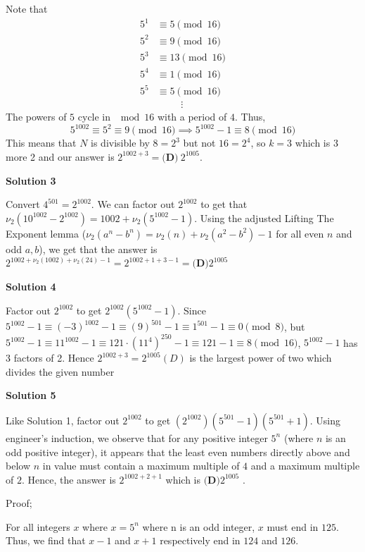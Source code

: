 \begin{enumerate}
 Note that
 \begin{align*} 5^1 &\equiv 5 \pmod{16} \\ 5^2 &\equiv 9 \pmod{16} \\ 5^3 &\equiv 13 \pmod{16} \\ 5^4 &\equiv 1 \pmod{16} \\ 5^5 &\equiv 5 \pmod{16} \\ &\: \: \qquad \vdots \end{align*}
The powers of $5$ cycle in $\mod{16}$ with a period of $4$. Thus, 
 \[5^{1002} \equiv 5^2 \equiv 9 \pmod{16} \implies 5^{1002} - 1 \equiv 8 \pmod{16}\]This means that $N$ is divisible by $8= 2^3$ but not $16 = 2^4$, so $k = 3$ which is 3 more 2 and our answer is $2^{1002 + 3} =\boxed{\textbf{(D)}\: 2^{1005}}$.

 



\textbf{Solution 3}

Convert $4^{501}=2^{1002}$. We can factor out $2^{1002}$ to get that $\nu_2(10^{1002}-2^{1002})=1002+\nu_2(5^{1002}-1)$. Using the adjusted Lifting The Exponent lemma ($\nu_2(a^n-b^n)=\nu_2(n)+\nu_2(a^2-b^2)-1$ for all even $n$ and odd $a,b$), we get that the answer is $2^{1002+\nu_2(1002)+\nu_2(24)-1}=2^{1002+1+3-1}=\boxed{\textbf{(D)}2^{1005}}$




\textbf{Solution 4}

Factor out $2^{1002}$ to get $2^{1002}(5^{1002} - 1)$. Since $5^{1002}-1\equiv (-3)^{1002}-1\equiv (9)^{501}-1\equiv 1^{501}-1\equiv 0\pmod{8}$, but $5^{1002}-1\equiv 11^{1002}-1\equiv 121\cdot (11^4)^{250} - 1\equiv 121 - 1\equiv 8 \pmod{16}$, $5^{1002}-1$ has 3 factors of 2. Hence $2^{1002 + 3} =\boxed{2^{1005}(D)}$ is the largest power of two which divides the given number

 



\textbf{Solution 5}

Like Solution 1, factor out $2^{1002}$ to get $(2^{1002})(5^{501}-1)(5^{501}+1)$. Using engineer's induction, we observe that for any positive integer $5^n$ (where $n$ is an odd positive integer), it appears that the least even numbers directly above and below $n$ in value must contain a maximum multiple of $4$ and a maximum multiple of $2$. Hence, the answer is $2^{1002+2+1}$ which is $\boxed{\textbf{(D)} 2^{1005}}$ .

 Proof;

 For all integers $x$ where $x=5^{n}$ where n is an odd integer, $x$ must end in $125.$ Thus, we find that $x-1$ and $x+1$ respectively end in $124$ and $126.$ 


\end{enumerate}
